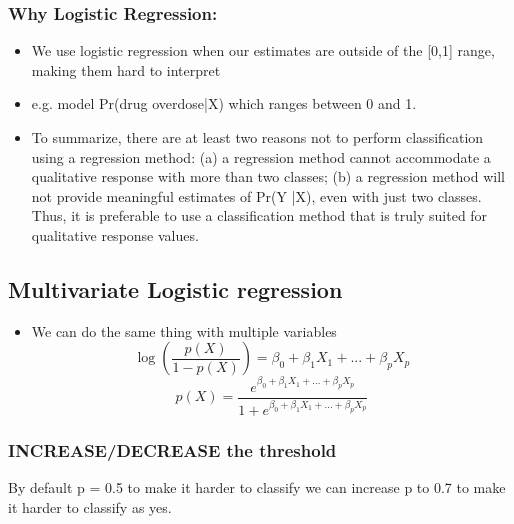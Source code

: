 \documentclass{article}
\begin{document}
\subsubsection{Why Logistic Regression:}
\begin{itemize}
    \item We use logistic regression when our estimates are outside of the [0,1] range, making them hard to interpret
    \item e.g. model Pr(drug overdose|X) which ranges between 0 and 1. 
    \item To summarize, there are at least two reasons not to perform classification using a regression method: (a) a regression method cannot accommodate a qualitative response with more than two classes; (b) a regression
method will not provide meaningful estimates of Pr(Y |X), even with just
two classes. Thus, it is preferable to use a classification method that is
truly suited for qualitative response values.
\end{itemize}

\subsection{Multivariate Logistic regression}

\begin{itemize}
    \item We can do the same thing with multiple variables
    \begin{equation*}
        \log(\frac{p(X)}{1 - p(X)}) = \beta_0 + \beta_1 X_1 + ... + \beta_p X_p
    \end{equation*}
    \begin{equation*}
        p(X) = \frac{e^{\beta_0 + \beta_1 X_1 + ... + \beta_p X_p}}{1 + e^{\beta_0 + \beta_1 X_1 + ... + \beta_p X_p}}
    \end{equation*}
\end{itemize}

\subsubsection{INCREASE/DECREASE the threshold}
 By default p = 0.5 to make it harder to classify we can increase p to 0.7 to make it harder to classify as yes.
\end{document}
